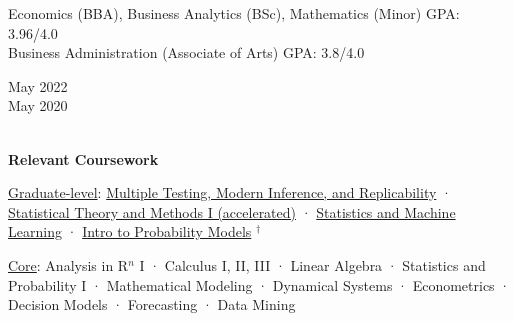     	\begin{minipage}{.75\linewidth} \begin{flushleft}
    		Economics (BBA), Business Analytics (BSc), Mathematics (Minor) \textemdash{} GPA: 3.96/4.0\\
            Business Administration (Associate of Arts) \textemdash{} GPA: 3.8/4.0
    	\end{flushleft} \end{minipage}
    \hfill 
    \begin{minipage}{.20\linewidth}\begin{flushright}
    	 May 2022\\
         May 2020
    	\end{flushright}
    \end{minipage} 
    \\
    \vspace{5pt}
    \textbf{Relevant Coursework} \\
    \vspace{-5pt}
            \begin{description}[font=$\bullet$]
            \item{\underline{Graduate-level}: \href{https://rinafb.github.io/teaching/27850_Autumn2023_syllabus.pdf}{Multiple Testing, Modern Inference, and Replicability} · \href{https://github.com/posmikdc/posmikdc.github.io/blob/master/pdf/STAT30030_LectureNotesAutumn2022.pdf}{Statistical Theory and Methods I (accelerated)} · \href{https://github.com/posmikdc/posmikdc.github.io/blob/master/pdf/Syllabus%20for%20STAT%205171-6071%20Spring2022.pdf}{Statistics and Machine Learning} · \href{https://galton.uchicago.edu/~yibi/teaching/stat317/2021/}{Intro to Probability Models} $^\dagger$}
            \vspace{-7pt}
            \item{\underline{Core}: Analysis in R$^n$ I · Calculus I, II, III · Linear Algebra · Statistics and Probability I · Mathematical Modeling · Dynamical Systems · Econometrics ·  Decision Models · Forecasting · Data Mining} \\
            \end{description}
    \vspace{-3pt}
    {\fontsize{8pt}{10pt}} \\

\vspace{0pt}

